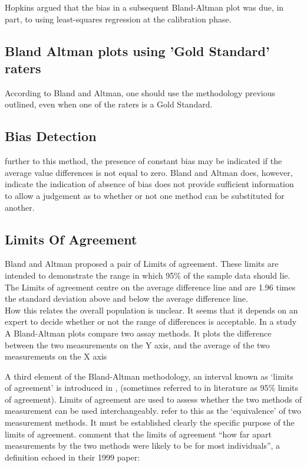 \documentclass[12pt, a4paper]{report}
\theoremstyle{plain}
\theoremstyle{definition}
\theoremstyle{remark}
\begin{document}
	
	Hopkins argued that the bias in a subsequent Bland-Altman plot was
	due, in part, to using least-squares regression at the calibration
	phase.
	
	\subsection{Bland Altman plots using 'Gold Standard' raters}
	According to Bland and Altman, one should use the methodology
	previous outlined, even when one of the raters is a Gold Standard.
	
	
	\subsection{Bias Detection}
	further to this method, the presence of constant bias may be
	indicated if the average value differences is not equal to zero.
	Bland and Altman does, however, indicate the indication of absence
	of bias does not provide sufficient information to allow a
	judgement as to whether or not one method can be substituted for
	another.
	
	
	
	
	\subsection{Limits Of Agreement}
	Bland and Altman proposed a pair of Limits of agreement. These
	limits are intended to demonstrate the range in which 95\% of the
	sample data should lie. The Limits of agreement centre on the
	average difference line and are 1.96 times the standard deviation
	above and below the average difference line.
	\\
	How this relates the overall population is unclear. It seems that
	it depends on an expert to decide whether or not the range of
	differences is acceptable. In a study A Bland-Altman plots compare
	two assay methods. It plots the difference between the two
	measurements on the Y axis, and the average of the two
	measurements on the X axis
	
	A third element of the Bland-Altman methodology, an interval known
	as `limits of agreement' is introduced in \citet*{BA86},
	(sometimes referred to in literature as 95\% limits of agreement).
	Limits of agreement are used to assess whether the two methods of
	measurement can be used interchangeably. \citet{BA86} refer to
	this as the `equivalence' of two measurement methods. It must be
	established clearly the specific purpose of the limits of
	agreement. \citet*{BA95} comment that the limits of agreement
	``how far apart measurements by the two methods were likely to be
	for most individuals'', a definition echoed in their 1999 paper:
	
\end{document}
